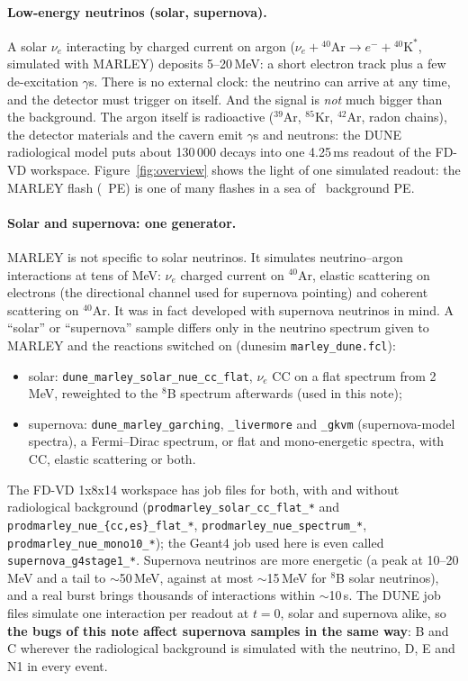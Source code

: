\documentclass[10pt]{article}
\newcommand{\code}[1]{\texttt{#1}}
\newcommand{\fn}[1]{\nolinkurl{#1}}
\begin{document}
\paragraph{Low-energy neutrinos (solar, supernova).} A solar $\nu_e$ interacting by charged current on argon
($\nu_e + {}^{40}\mathrm{Ar} \to e^- + {}^{40}\mathrm{K}^*$, simulated with MARLEY) deposits 5--20\,MeV:
a short electron track plus a few de-excitation $\gamma$s. There is no external clock: the neutrino can arrive at any
time, and the detector must trigger on itself. And the signal is \emph{not} much bigger than the background. The
argon itself is radioactive (${}^{39}$Ar, ${}^{85}$Kr, ${}^{42}$Ar, radon chains), the detector materials and the cavern
emit $\gamma$s and neutrons: the DUNE radiological model puts about 130\,000 decays into one 4.25\,ms readout of the
FD-VD workspace. Figure~\ref{fig:overview} shows the light of one simulated readout: the MARLEY flash
(\numAexmarleype\ PE) is one of many flashes in a sea of \numAexbkgpe\ background PE.

\paragraph{Solar and supernova: one generator.} MARLEY is not specific to solar neutrinos. It simulates
neutrino--argon interactions at tens of MeV: $\nu_e$ charged current on ${}^{40}$Ar, elastic scattering on electrons
(the directional channel used for supernova pointing) and coherent scattering on ${}^{40}$Ar. It was in fact
developed with supernova neutrinos in mind. A ``solar'' or ``supernova'' sample differs only in the neutrino spectrum
given to MARLEY and the reactions switched on (dunesim \fn{marley_dune.fcl}):
\begin{itemize}
\item solar: \code{dune\_marley\_solar\_nue\_cc\_flat}, $\nu_e$ CC on a flat spectrum from 2\,MeV, reweighted to the
  ${}^{8}$B spectrum afterwards (used in this note);
\item supernova: \code{dune\_marley\_garching}, \code{\_livermore} and \code{\_gkvm} (supernova-model spectra), a
  Fermi--Dirac spectrum, or flat and mono-energetic spectra, with CC, elastic scattering or both.
\end{itemize}
The FD-VD 1x8x14 workspace has job files for both, with and without radiological background
(\fn{prodmarley_solar_cc_flat_*} and \fn{prodmarley_nue_{cc,es}_flat_*}, \fn{prodmarley_nue_spectrum_*},
\fn{prodmarley_nue_mono10_*}); the Geant4 job used here is even called \fn{supernova_g4stage1_*}. Supernova
neutrinos are more energetic (a peak at 10--20\,MeV and a tail to $\sim$50\,MeV, against at most $\sim$15\,MeV for
${}^{8}$B solar neutrinos), and a real burst brings thousands of interactions within $\sim$10\,s. The DUNE job files
simulate one interaction per readout at $t=0$, solar and supernova alike, so \textbf{the bugs of this note affect
supernova samples in the same way}: B and C wherever the radiological background is simulated with the neutrino,
D, E and N1 in every event.
\end{document}
